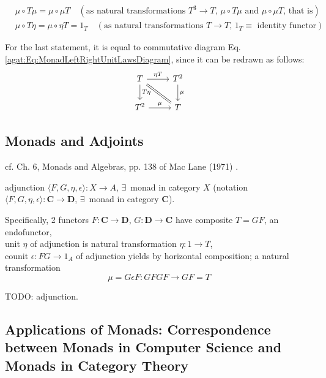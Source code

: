 \begin{proposition}\label{agat:Prop:MonadCoherenceConditions}
	\begin{equation}
	\begin{aligned}
	& \mu \circ T \mu = \mu \circ \mu T \quad (\text{as natural transformations $T^3 \to T$, $\mu \circ T\mu$ and $\mu \circ \mu T$, that is}) \\ 
	& \mu \circ T \eta = \mu \circ \eta T = 1_T \quad (\text{as natural transformations $T \to T$, $1_T \equiv$ identity functor}) 
	\end{aligned}
	\end{equation}
	
	For the last statement, it is equal to commutative diagram Eq. \ref{agat:Eq:MonadLeftRightUnitLawsDiagram}, since it can be redrawn as follows:
\[
\begin{tikzcd}
	T \arrow{d}{ T \eta} \arrow{r}{\eta T} \arrow[equal]{dr} & T^2 \arrow{d}{\mu} \\
	T^2 \arrow{r}{\mu} & T
\end{tikzcd}	
\]
	
\end{proposition}

\subsection{Monads and Adjoints}

cf. Ch. 6, Monads and Algebras, pp. 138 of Mac Lane (1971) \cite{agat:MacL1978}.
\begin{proposition}
	adjunction $\langle F, G, \eta, \epsilon \rangle : X \to A$, $\exists \, $ monad in category $X$ (notation $\langle F,G, \eta, \epsilon \rangle : \mathbf{C} \to \mathbf{D}$, $\exists \, $ monad in category $\mathbf{C}$). 
	
	Specifically, 2 functors $F:\mathbf{C} \to \mathbf{D}$, $G:\mathbf{D} \to \mathbf{C}$ have composite $T = GF$, an endofunctor, \\
	unit $\eta$ of adjunction is natural transformation $\eta : 1 \to T$, \\
	counit $\epsilon :FG \to 1_A$ of adjunction yields by horizontal composition; a natural transformation
	\[
	\mu = G\epsilon F: GFGF \to GF = T
	\] 
\end{proposition}

TODO: adjunction.

\subsection{Applications of Monads: Correspondence between Monads in Computer Science and Monads in Category Theory}

